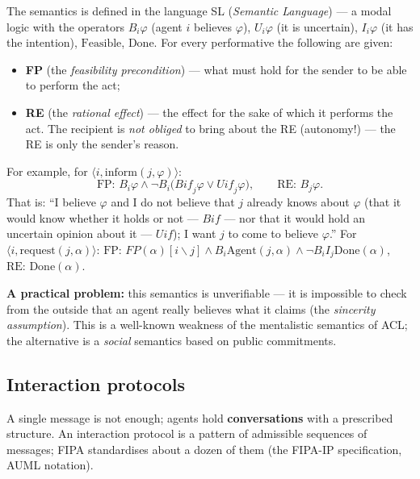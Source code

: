 \documentclass[11pt,a4paper]{article}
\theoremstyle{definition}
\providecommand{\uv}[1]{``#1''}
\begin{document}
\begin{defbox}
The semantics is defined in the language SL (\emph{Semantic Language}) --- a modal logic
with the operators $B_i\varphi$ (agent $i$ believes $\varphi$), $U_i\varphi$ (it is uncertain),
$I_i\varphi$ (it has the intention), $\mathrm{Feasible}$, $\mathrm{Done}$. For every performative the
following are given:
\begin{itemize}
\item \textbf{FP} (the \emph{feasibility precondition}) --- what must hold for the sender to be able
  to perform the act;
\item \textbf{RE} (the \emph{rational effect}) --- the effect for the sake of which it performs the
  act. The recipient is \emph{not obliged} to bring about the RE (autonomy!) --- the RE is only the
  sender's reason.
\end{itemize}
For example, for $\langle i, \mathrm{inform}(j,\varphi)\rangle$:
\[
\text{FP: } B_i\varphi \wedge \neg B_i\big(\mathit{Bif}_j\varphi \vee \mathit{Uif}_j\varphi\big),
\qquad
\text{RE: } B_j\varphi .
\]
That is: \uv{I believe $\varphi$ and I do not believe that $j$ already knows about $\varphi$ (that it
would know whether it holds or not --- $\mathit{Bif}$ --- nor that it would hold an uncertain opinion
about it --- $\mathit{Uif}$); I want $j$ to come to believe $\varphi$.}
For $\langle i, \mathrm{request}(j,\alpha)\rangle$:
$\text{FP: } \mathit{FP}(\alpha)[i \backslash j] \wedge B_i \mathrm{Agent}(j,\alpha)
\wedge \neg B_i I_j \mathrm{Done}(\alpha)$, $\text{RE: } \mathrm{Done}(\alpha)$.

\textbf{A practical problem:} this semantics is unverifiable --- it is impossible to check from the
outside that an agent really believes what it claims (the \emph{sincerity assumption}). This is a
well-known weakness of the mentalistic semantics of ACL; the alternative is a \emph{social} semantics
based on public commitments.
\end{defbox}

\subsection{Interaction protocols}

A single message is not enough; agents hold \textbf{conversations} with a prescribed structure.
An interaction protocol is a pattern of admissible sequences of messages;
FIPA standardises about a dozen of them (the FIPA-IP specification, AUML notation).
\end{document}
